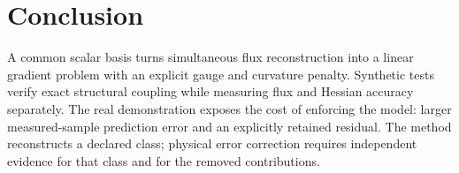 \section{Conclusion}
A common scalar basis turns simultaneous flux reconstruction into a linear
gradient problem with an explicit gauge and curvature penalty. Synthetic tests
verify exact structural coupling while measuring flux and Hessian accuracy
separately. The real demonstration exposes the cost of enforcing the model:
larger measured-sample prediction error and an explicitly retained residual.
The method reconstructs a declared class; physical error correction requires
independent evidence for that class and for the removed contributions.

